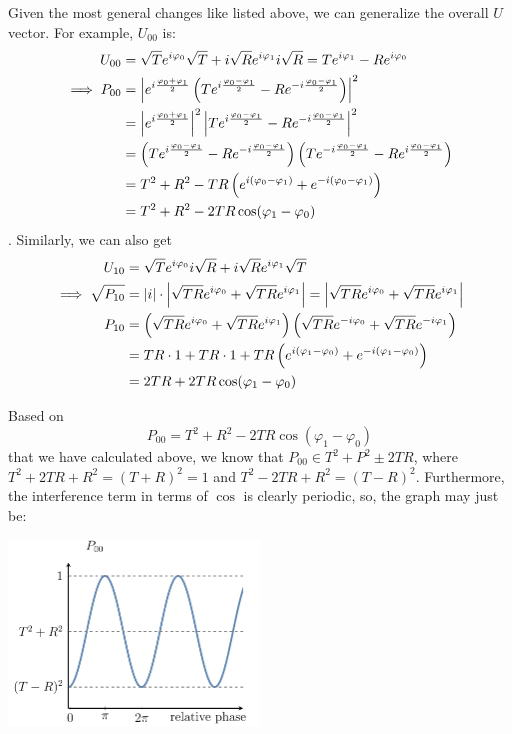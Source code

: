 \documentclass[12pt]{article}
\begin{document}
Given the most general changes like listed above, we can generalize the overall $U$ vector. For example, $U_{00}$ is: $$
\begin{aligned}
    U_{00}
        &= \sqrt{T}e^{i\varphi_0}\sqrt{T} + i\sqrt{R}e^{i\varphi_1}i\sqrt{R} = Te^{i\varphi_1} - Re^{i\varphi_0}\\
\implies
    P_{00}
        &= \left|e^{i\frac{\varphi_0+\varphi_1}{2}}\left(Te^{i\frac{\varphi_0-\varphi_1}{2}} - Re^{-i\frac{\varphi_0-\varphi_1}{2}}\right)\right|^2\\
        &= \left|e^{i\frac{\varphi_0+\varphi_1}{2}}\right|^2\left|Te^{i\frac{\varphi_0-\varphi_1}{2}} - Re^{-i\frac{\varphi_0-\varphi_1}{2}}\right|^2\\
        &= \left(Te^{i\frac{\varphi_0-\varphi_1}{2}} - Re^{-i\frac{\varphi_0-\varphi_1}{2}}\right)\left(Te^{-i\frac{\varphi_0-\varphi_1}{2}} - Re^{i\frac{\varphi_0-\varphi_1}{2}}\right)\\
        &= T^2 + R^2 - TR\left(e^{i(\varphi_0 -\varphi_1)} + e^{-i(\varphi_0 -\varphi_1)}\right)\\
        &= T^2 + R^2 - 2TR\cos(\varphi_1 - \varphi_0)
\end{aligned}
$$. Similarly, we can also get $$
\begin{aligned}
    U_{10}
        &= \sqrt{T}e^{i\varphi_0}i\sqrt{R} + i\sqrt{R}e^{i\varphi_1}\sqrt{T}\\
\implies
    \sqrt{P_{10}}
        &= |i|\cdot \left|\sqrt{TR}e^{i\varphi_0} + \sqrt{TR}e^{i\varphi_1}\right| = \left|\sqrt{TR}e^{i\varphi_0} + \sqrt{TR}e^{i\varphi_1}\right|\\
    P_{10}
        &= \left(\sqrt{TR}e^{i\varphi_0} + \sqrt{TR}e^{i\varphi_1}\right)\left(\sqrt{TR}e^{-i\varphi_0} + \sqrt{TR}e^{-i\varphi_1}\right)\\
        &= TR\cdot 1 + TR\cdot 1 + TR\left(e^{i(\varphi_1-\varphi_0)} + e^{-i(\varphi_1-\varphi_0)}\right)\\
        &= 2TR + 2TR\cos(\varphi_1-\varphi_0)
\end{aligned}
$$

\begin{proposition}
Based on $$
P_{00} = T^2 + R^2 - 2TR \cos(\varphi_1 - \varphi_0)
$$ that we have calculated above, we know that $P_{00}\in T^2 + P^2 \pm 2TR$, where $T^2 + 2TR + R^2 = (T+R)^2 = 1$ and $T^2 - 2TR + R^2 = (T-R)^2$. Furthermore, the interference term in terms of $\cos$ is clearly periodic, so, the graph may just be:
\begin{center}
\includegraphics[width = 18em]{images/5.jpg}
\end{center}
\end{proposition}
\end{document}
